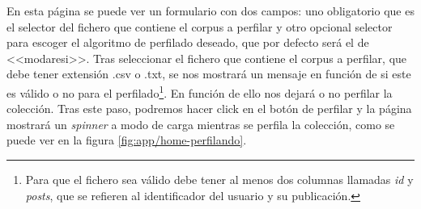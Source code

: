 En esta página se puede ver un formulario con dos campos: uno obligatorio que es el selector del fichero que contiene el corpus a perfilar y otro opcional selector para escoger el algoritmo de perfilado deseado, que por defecto será el de <<modaresi>>. Tras seleccionar el fichero que contiene el corpus a perfilar, que debe tener extensión .csv o .txt, se nos mostrará un mensaje en función de si este es válido o no para el perfilado\footnote{Para que el fichero sea válido debe tener al menos dos columnas llamadas \textit{id} y \textit{posts}, que se refieren al identificador del usuario y su publicación.}. En función de ello nos dejará o no perfilar la colección. Tras este paso, podremos hacer click en el botón de perfilar y la página mostrará un \textit{spinner} a modo de carga mientras se perfila la colección, como se puede ver en la figura \ref{fig:app/home-perfilando}.

